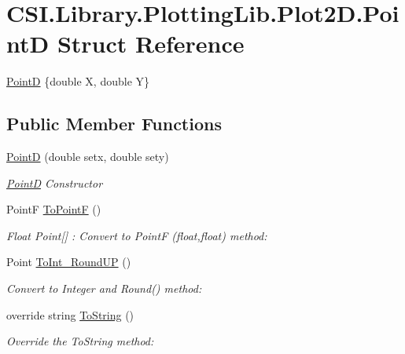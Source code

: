 \hypertarget{struct_c_s_i_1_1_library_1_1_plotting_lib_1_1_plot2_d_1_1_point_d}{}\section{C\+S\+I.\+Library.\+Plotting\+Lib.\+Plot2\+D.\+PointD Struct Reference}
\label{struct_c_s_i_1_1_library_1_1_plotting_lib_1_1_plot2_d_1_1_point_d}


\mbox{\hyperlink{struct_c_s_i_1_1_library_1_1_plotting_lib_1_1_plot2_d_1_1_point_d}{PointD}} \{double X, double Y\}  


\subsection*{Public Member Functions}
\begin{DoxyCompactItemize}
\item 
\mbox{\hyperlink{struct_c_s_i_1_1_library_1_1_plotting_lib_1_1_plot2_d_1_1_point_d_a506d1beedb1c98661e1d8d436167e1e3}{PointD}} (double setx, double sety)
\begin{DoxyCompactList}\small\item\em \mbox{\hyperlink{struct_c_s_i_1_1_library_1_1_plotting_lib_1_1_plot2_d_1_1_point_d}{PointD}} Constructor \end{DoxyCompactList}\item 
PointF \mbox{\hyperlink{struct_c_s_i_1_1_library_1_1_plotting_lib_1_1_plot2_d_1_1_point_d_af2c7629547d17ef06b48580773efc681}{To\+PointF}} ()
\begin{DoxyCompactList}\small\item\em Float Point\mbox{[}\mbox{]} \+: Convert to PointF (float,float) method\+: \end{DoxyCompactList}\item 
Point \mbox{\hyperlink{struct_c_s_i_1_1_library_1_1_plotting_lib_1_1_plot2_d_1_1_point_d_a1468162247f03b100093a43bc5581333}{To\+Int\+\_\+\+Round\+UP}} ()
\begin{DoxyCompactList}\small\item\em Convert to Integer and Round() method\+: \end{DoxyCompactList}\item 
override string \mbox{\hyperlink{struct_c_s_i_1_1_library_1_1_plotting_lib_1_1_plot2_d_1_1_point_d_abacc6e019b0513af59b5616e943f1322}{To\+String}} ()
\begin{DoxyCompactList}\small\item\em Override the To\+String method\+: \end{DoxyCompactList}\end{DoxyCompactItemize}
